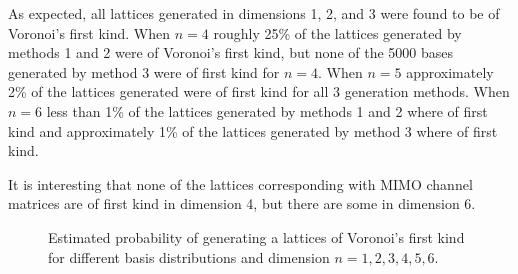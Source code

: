 \documentclass[a4paper,10pt]{article}
\begin{document}
As expected, all lattices generated in dimensions 1, 2, and 3 were found to be of Voronoi's first kind.  When $n=4$ roughly 25\% of the lattices generated by methods 1 and 2 were of Voronoi's first kind, but none of the 5000 bases generated by method 3 were of first kind for $n=4$.  When $n=5$ approximately 2\% of the lattices generated were of first kind for all 3 generation methods.  When $n=6$ less than 1\% of the lattices generated by methods 1 and 2 where of first kind and approximately 1\% of the lattices generated by method 3 where of first kind.

It is interesting that none of the lattices corresponding with MIMO channel matrices are of first kind in dimension 4, but there are some in dimension 6. 



\begin{figure}[tp]
\centering 
\caption{Estimated probability of generating a lattices of Voronoi's first kind for different basis distributions and dimension $n=1,2,3,4,5,6$.}
\end{figure}




 
%
\end{document}
